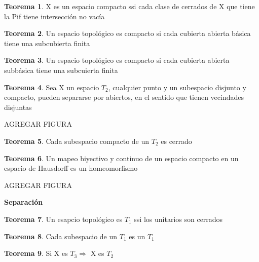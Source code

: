 \documentclass{article}
\theoremstyle{definition}
\newtheorem{theorem}{Teorema}[section]
\begin{document}
\begin{theorem}
	X es un espacio compacto ssi cada clase de cerrados de X que tiene la Pif tiene intersección no vacía
\end{theorem}


\begin{theorem}

	Un espacio topológico es compacto si cada cubierta abierta básica tiene una subcubierta finita
\end{theorem}


\begin{theorem}
	Un espacio topológico es compacto si cada cubierta abierta subbásica tiene una subcuierta finita
\end{theorem}


\begin{theorem}
	Sea X un espacio $T_2$, cualquier punto y un subespacio disjunto y compacto, pueden separarse por abiertos, en el sentido que tienen vecindades disjuntas
	
	AGREGAR FIGURA
\end{theorem}


\begin{theorem}

	Cada subespacio compacto de un $T_2$ es cerrado
\end{theorem}


\begin{theorem}
	Un mapeo biyectivo y continuo de un espacio compacto en un espacio de Hausdorff es un homeomorfismo
	
	AGREGAR FIGURA
\end{theorem}


\textbf{Separación}
\begin{theorem}
	Un esapcio topológico es $T_1$ ssi los unitarios son cerrados
\end{theorem}


\begin{theorem}
	Cada subespacio de un $T_1$ es un $T_1$
\end{theorem}


\begin{theorem}
	Si X es $T_3\Rightarrow$ X es $T_2$
\end{theorem}
\end{document}
